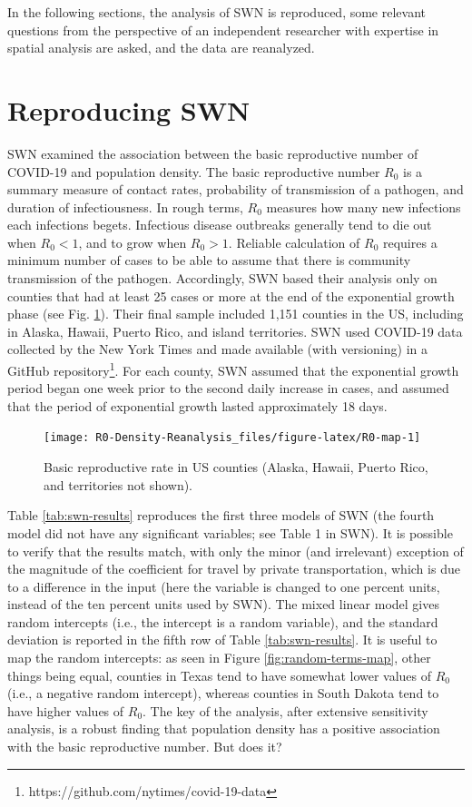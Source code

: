 \documentclass[preprint, 3p,
authoryear]{elsarticle} %
\begin{document}
In the following sections, the analysis of SWN is reproduced, some
relevant questions from the perspective of an independent researcher
with expertise in spatial analysis are asked, and the data are
reanalyzed.

\hypertarget{reproducing-swn}{%
\section{Reproducing SWN}\label{reproducing-swn}}

SWN examined the association between the basic reproductive number of
COVID-19 and population density. The basic reproductive number \(R_0\)
is a summary measure of contact rates, probability of transmission of a
pathogen, and duration of infectiousness. In rough terms, \(R_0\)
measures how many new infections each infections begets. Infectious
disease outbreaks generally tend to die out when \(R_0<1\), and to grow
when \(R_0>1\). Reliable calculation of \(R_0\) requires a minimum
number of cases to be able to assume that there is community
transmission of the pathogen. Accordingly, SWN based their analysis only
on counties that had at least 25 cases or more at the end of the
exponential growth phase (see Fig. \ref{fig:R0-map}). Their final sample
included 1,151 counties in the US, including in Alaska, Hawaii, Puerto
Rico, and island territories. SWN used COVID-19 data collected by the
New York Times and made available (with versioning) in a GitHub
repository\footnote{https://github.com/nytimes/covid-19-data}. For each
county, SWN assumed that the exponential growth period began one week
prior to the second daily increase in cases, and assumed that the period
of exponential growth lasted approximately 18 days.

\begin{figure}
\texttt{[image: R0-Density-Reanalysis\_files/figure-latex/R0-map-1]} \caption{\label{fig:R0-map}Basic reproductive rate in US counties (Alaska, Hawaii, Puerto Rico, and territories not shown).}\label{fig:R0-map}
\end{figure}

Table \ref{tab:swn-results} reproduces the first three models of SWN
(the fourth model did not have any significant variables; see Table 1 in
SWN). It is possible to verify that the results match, with only the
minor (and irrelevant) exception of the magnitude of the coefficient for
travel by private transportation, which is due to a difference in the
input (here the variable is changed to one percent units, instead of the
ten percent units used by SWN). The mixed linear model gives random
intercepts (i.e., the intercept is a random variable), and the standard
deviation is reported in the fifth row of Table \ref{tab:swn-results}.
It is useful to map the random intercepts: as seen in Figure
\ref{fig:random-terms-map}, other things being equal, counties in Texas
tend to have somewhat lower values of \(R_0\) (i.e., a negative random
intercept), whereas counties in South Dakota tend to have higher values
of \(R_0\). The key of the analysis, after extensive sensitivity
analysis, is a robust finding that population density has a positive
association with the basic reproductive number. But does it?
\end{document}
